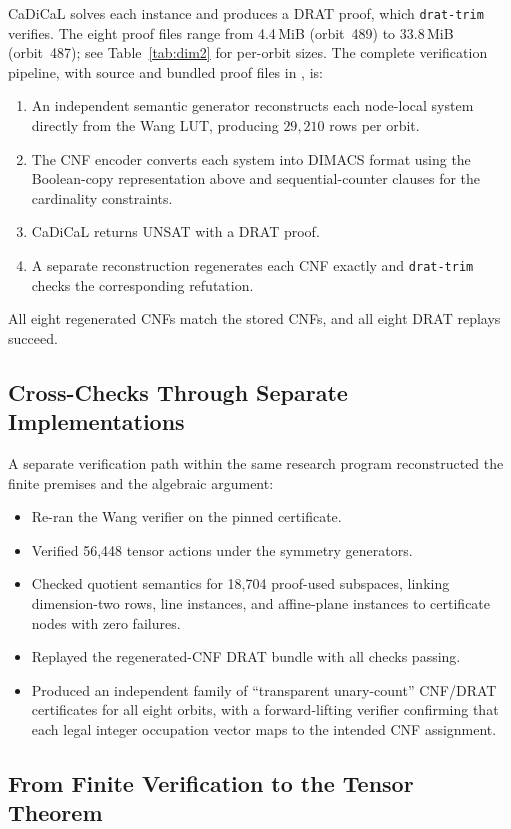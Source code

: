 \documentclass[11pt,a4paper]{article}
\begin{document}
CaDiCaL solves each instance and produces a DRAT proof, which \texttt{drat-trim} verifies.  The eight proof files range from 4.4\,MiB (orbit~489) to 33.8\,MiB (orbit~487); see Table~\ref{tab:dim2} for per-orbit sizes.  The complete verification pipeline, with source and bundled proof files in , is:
\begin{enumerate}
  \item An independent semantic generator reconstructs each node-local system directly from the Wang LUT, producing $29{,}210$ rows per orbit.
  \item The CNF encoder converts each system into DIMACS format using the Boolean-copy representation above and sequential-counter clauses for the cardinality constraints.
  \item CaDiCaL returns UNSAT with a DRAT proof.
  \item A separate reconstruction regenerates each CNF exactly and
  \texttt{drat-trim} checks the corresponding refutation.
\end{enumerate}
All eight regenerated CNFs match the stored CNFs, and all eight DRAT replays succeed.

\subsection{Cross-Checks Through Separate Implementations}

A separate verification path within the same research program reconstructed
the finite premises and the algebraic argument:
\begin{itemize}
  \item Re-ran the Wang verifier on the pinned certificate.
  \item Verified 56,448 tensor actions under the symmetry generators.
  \item Checked quotient semantics for 18,704 proof-used subspaces, linking dimension-two rows, line instances, and affine-plane instances to certificate nodes with zero failures.
  \item Replayed the regenerated-CNF DRAT bundle with all checks passing.
  \item Produced an independent family of ``transparent unary-count'' CNF/DRAT certificates for all eight orbits, with a forward-lifting verifier confirming that each legal integer occupation vector maps to the intended CNF assignment.
\end{itemize}

\subsection{From Finite Verification to the Tensor Theorem}
\end{document}
